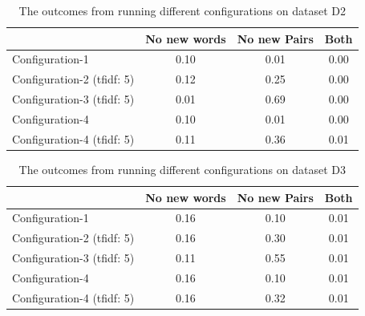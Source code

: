 \begin{center}
  \begin{table}[ht]
  \begin{tabular}{|l|c|c|c|}
    \hline
    &  No new words & No new Pairs & Both \\ \hline
    Configuration-1                    & 0.10  & 0.01  & 0.00 \\ \hline
    Configuration-2 (tfidf: 5)         & 0.12  & 0.25  & 0.00 \\ \hline
    Configuration-3 (tfidf: 5)         & 0.01  & 0.69  & 0.00 \\ \hline
    Configuration-4                    & 0.10  & 0.01  & 0.00 \\ \hline
    Configuration-4 (tfidf: 5)         & 0.11  & 0.36  & 0.01 \\ \hline
  \end{tabular}
  \caption{The outcomes from running different configurations on dataset D2}
  \label{tab:d2}
\end{table}
\end{center}

\begin{center}
  \begin{table}[ht]
  \begin{tabular}{|l|c|c|c|}
    \hline
    &  No new words & No new Pairs & Both \\ \hline
    Configuration-1                    & 0.16  & 0.10  & 0.01 \\ \hline
    Configuration-2 (tfidf: 5)         & 0.16  & 0.30  & 0.01 \\ \hline
    Configuration-3 (tfidf: 5)         & 0.11  & 0.55  & 0.01 \\ \hline
    Configuration-4                    & 0.16  & 0.10  & 0.01 \\ \hline
    Configuration-4 (tfidf: 5)         & 0.16  & 0.32  & 0.01 \\ \hline
  \end{tabular}
  \caption{The outcomes from running different configurations on dataset D3}
  \label{tab:d3}
\end{table}
\end{center}

